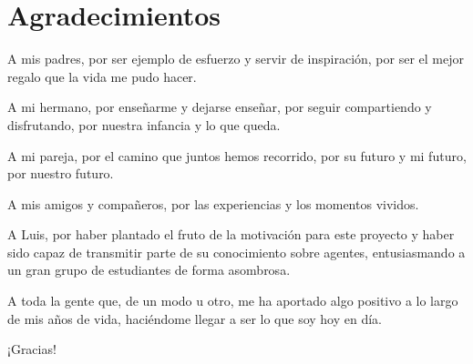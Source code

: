 \chapter*{Agradecimientos}

\thispagestyle{empty}

   \vspace{1cm}
   
   \vspace{1cm}
   
A mis padres, por ser ejemplo de esfuerzo y servir de inspiración, por ser el mejor regalo que la vida me pudo hacer. 

   \vspace{1cm}

A mi hermano, por enseñarme y dejarse enseñar, por seguir compartiendo y disfrutando, por nuestra infancia y lo que queda.

   \vspace{1cm}
   
A mi pareja, por el camino que juntos hemos recorrido, por su futuro y mi futuro, por nuestro futuro.
   
   \vspace{1cm}

A mis amigos y compañeros, por las experiencias y los momentos vividos.

   \vspace{1cm}

A Luis, por haber plantado el fruto de la motivación para este proyecto y haber sido capaz de transmitir parte de su conocimiento sobre agentes, entusiasmando a un gran grupo de estudiantes de forma asombrosa.

   \vspace{1cm}

A toda la gente que, de un modo u otro, me ha aportado algo positivo a lo largo de mis años de vida, haciéndome llegar a ser lo que soy hoy en día.

   \vspace{1cm}
   
¡Gracias!
